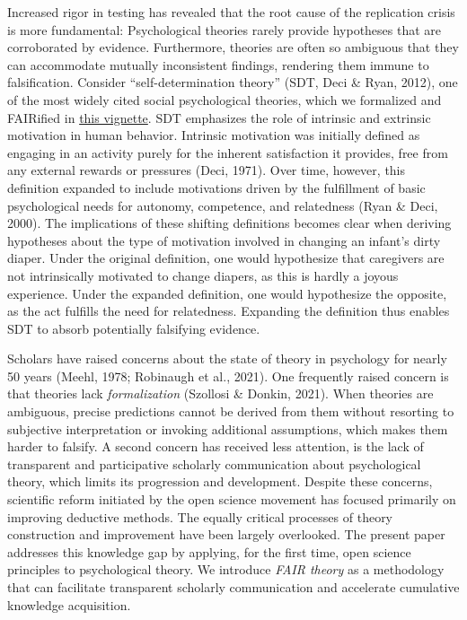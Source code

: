 \documentclass[
  man, noextraspace,floatsintext]{apa7}
\begin{document}
Increased rigor in testing has revealed that the root cause of the replication crisis is more fundamental:
Psychological theories rarely provide hypotheses that are corroborated by evidence.
Furthermore, theories are often so ambiguous that they can accommodate mutually inconsistent findings,
rendering them immune to falsification.
Consider ``self-determination theory'' (SDT, Deci \& Ryan, 2012), one of the most widely cited social psychological theories, which we formalized and FAIRified in \href{https://cjvanlissa.github.io/theorytools/articles/formalizing_sdt.html}{this vignette}.
SDT emphasizes the role of intrinsic and extrinsic motivation in human behavior.
Intrinsic motivation was initially defined as engaging in an activity purely for the inherent satisfaction it provides, free from any external rewards or pressures (Deci, 1971).
Over time, however, this definition expanded to include motivations driven by the fulfillment of basic psychological needs for autonomy, competence, and relatedness (Ryan \& Deci, 2000).
The implications of these shifting definitions becomes clear when deriving hypotheses about the type of motivation involved in changing an infant's dirty diaper.
Under the original definition, one would hypothesize that caregivers are not intrinsically motivated to change diapers, as this is hardly a joyous experience.
Under the expanded definition, one would hypothesize the opposite, as the act fulfills the need for relatedness.
Expanding the definition thus enables SDT to absorb potentially falsifying evidence.

Scholars have raised concerns about the state of theory in psychology for nearly 50 years (Meehl, 1978; Robinaugh et al., 2021).
One frequently raised concern is that theories lack \emph{formalization} (Szollosi \& Donkin, 2021).
When theories are ambiguous,
precise predictions cannot be derived from them without
resorting to subjective interpretation or invoking additional assumptions,
which makes them harder to falsify.
A second concern has received less attention,
is the lack of transparent and participative scholarly communication about psychological theory, which limits its progression and development.
Despite these concerns, scientific reform initiated by the open science movement has focused primarily on improving deductive methods.
The equally critical processes of theory construction and improvement have been largely overlooked.
The present paper addresses this knowledge gap by applying, for the first time,
open science principles to psychological theory.
We introduce \emph{FAIR theory} as a methodology that can facilitate transparent scholarly communication and accelerate cumulative knowledge acquisition.
\end{document}
